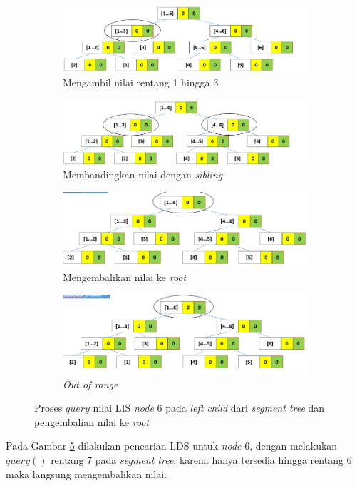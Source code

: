 \begin{figure}[H]
	\begin{subfigure}{1.0\textwidth}
		\centering
		\includegraphics[scale=0.33]{assets/images/Ilustrasi_proses_11.PNG}
		\caption{Mengambil nilai rentang 1 hingga 3}
		\label{fig:subproses11}
	\end{subfigure}
	\begin{subfigure}{1.0\textwidth}
		\centering
		\includegraphics[scale=0.33]{assets/images/Ilustrasi_proses_12.PNG}
		\caption{Membandingkan nilai dengan \textit{sibling}}
		\label{fig:subproses12}
	\end{subfigure}
	\begin{subfigure}{1.0\textwidth}
		\centering
		\includegraphics[scale=0.33]{assets/images/Ilustrasi_proses_13.PNG}
		\caption{Mengembalikan nilai ke \textit{root}}
		\label{fig:subproses13}
	\end{subfigure}
	\begin{subfigure}{1.0\textwidth}
		\centering
		\includegraphics[scale=0.33]{assets/images/Ilustrasi_proses_14.PNG}
		\caption{\textit{Out of range}}
		\label{fig:subproses14}
	\end{subfigure}
	\caption{Proses \textit{$query$} nilai LIS \textit{node} 6 pada \textit{left child} dari \textit{segment tree} dan pengembalian nilai ke \textit{root}}
\end{figure}
\quad Pada Gambar \ref{fig:subproses14} dilakukan pencarian LDS untuk \textit{node} 6, dengan melakukan \textit{$query()$} rentang 7 pada \textit{segment tree}, karena hanya tersedia hingga rentang 6 maka langsung mengembalikan nilai.\newpage

